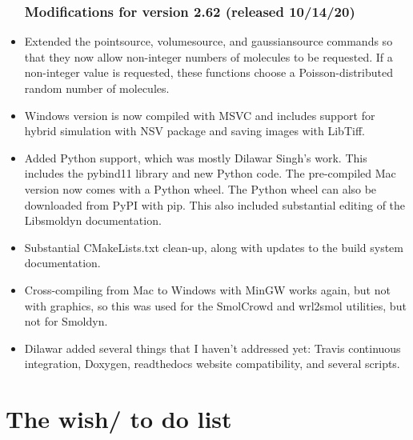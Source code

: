 \documentclass {book}
\begin{document}
\begin{itemize}
\subsection*{Modifications for version 2.62 (released 10/14/20)}
\item Extended the pointsource, volumesource, and gaussiansource commands so that they now allow non-integer numbers of molecules to be requested. If a non-integer value is requested, these functions choose a Poisson-distributed random number of molecules.
\item Windows version is now compiled with MSVC and includes support for hybrid simulation with NSV package and saving images with LibTiff.
\item Added Python support, which was mostly Dilawar Singh's work. This includes the pybind11 library and new Python code. The pre-compiled Mac version now comes with a Python wheel. The Python wheel can also be downloaded from PyPI with pip. This also included substantial editing of the Libsmoldyn documentation.
\item Substantial CMakeLists.txt clean-up, along with updates to the build system documentation.
\item Cross-compiling from Mac to Windows with MinGW works again, but not with graphics, so this was used for the SmolCrowd and wrl2smol utilities, but not for Smoldyn.
\item Dilawar added several things that I haven't addressed yet: Travis continuous integration, Doxygen, readthedocs website compatibility, and several scripts.

\end{itemize}


\chapter{The wish/ to do list}

\end{document}
